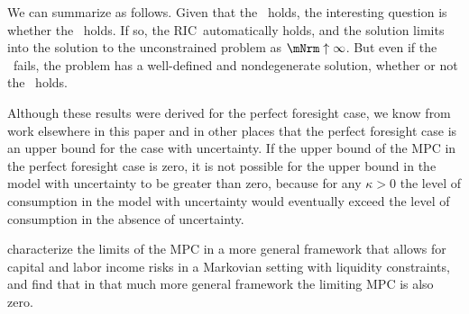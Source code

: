 \documentclass[\econtexRoot/BufferStockTheory]{subfiles}
\begin{document}
We can summarize as follows.  Given that the \GICRaw~holds, the interesting question is whether the \FHWC~holds.  If so, the RIC~automatically holds, and the solution limits into the solution to the unconstrained problem as $\mNrm \uparrow \infty$.  But even if the \FHWC~fails, the problem has a well-defined and nondegenerate solution, whether or not the \RIC~holds.

Although these results were derived for the perfect foresight case, we know from work elsewhere in this paper and in other places that the perfect foresight case is an upper bound for the case with uncertainty.  If the upper bound of the MPC in the perfect foresight case is zero, it is not possible for the upper bound in the model with uncertainty to be greater than zero, because for any $\kappa > 0$ the level of consumption in the model with uncertainty would eventually exceed the level of consumption in the absence of uncertainty.

\cite{maTodaRich} characterize the limits of the MPC in a more general framework that allows for capital and labor income risks in a Markovian setting with liquidity constraints, and find that in that much more general framework the limiting MPC is also zero.%

\onlyinsubfile{\pagebreak}
\end{document}
